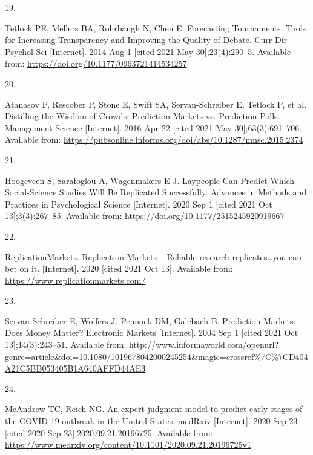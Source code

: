 \documentclass[
]{article}
\newlength{\cslhangindent}
\newlength{\csllabelwidth}
\newlength{\cslentryspacingunit} %
\newenvironment{CSLReferences}[2] %
 {%
  \setlength{\parindent}{0pt}
  \ifodd #1
  \let\oldpar\par
  \def\par{\hangindent=\cslhangindent\oldpar}
  \fi
  \setlength{\parskip}{#2\cslentryspacingunit}
 }%
 {}
\newcommand{\CSLLeftMargin}[1]{\parbox[t]{\csllabelwidth}{#1}}
\newcommand{\CSLRightInline}[1]{\parbox[t]{\linewidth - \csllabelwidth}{#1}\break}
\begin{document}
\begin{CSLReferences}{0}{0}
\leavevmode{}%
\CSLLeftMargin{19. }
\CSLRightInline{Tetlock PE, Mellers BA, Rohrbaugh N, Chen E. Forecasting {Tournaments}: {Tools} for {Increasing Transparency} and {Improving} the {Quality} of {Debate}. Curr Dir Psychol Sci {[}Internet{]}. 2014 Aug 1 {[}cited 2021 May 30{]};23(4):290--5. Available from: \url{https://doi.org/10.1177/0963721414534257}}

\leavevmode{}%
\CSLLeftMargin{20. }
\CSLRightInline{Atanasov P, Rescober P, Stone E, Swift SA, Servan-Schreiber E, Tetlock P, et al. Distilling the {Wisdom} of {Crowds}: {Prediction Markets} vs. {Prediction Polls}. Management Science {[}Internet{]}. 2016 Apr 22 {[}cited 2021 May 30{]};63(3):691--706. Available from: \url{https://pubsonline.informs.org/doi/abs/10.1287/mnsc.2015.2374}}

\leavevmode{}%
\CSLLeftMargin{21. }
\CSLRightInline{Hoogeveen S, Sarafoglou A, Wagenmakers E-J. Laypeople {Can Predict Which Social-Science Studies Will Be Replicated Successfully}. Advances in Methods and Practices in Psychological Science {[}Internet{]}. 2020 Sep 1 {[}cited 2021 Oct 13{]};3(3):267--85. Available from: \url{https://doi.org/10.1177/2515245920919667}}

\leavevmode{}%
\CSLLeftMargin{22. }
\CSLRightInline{ReplicationMarkets. Replication {Markets} -- {Reliable} research replicates\ldots you can bet on it. {[}Internet{]}. 2020 {[}cited 2021 Oct 13{]}. Available from: \url{https://www.replicationmarkets.com/}}

\leavevmode{}%
\CSLLeftMargin{23. }
\CSLRightInline{Servan-Schreiber E, Wolfers J, Pennock DM, Galebach B. Prediction {Markets}: {Does Money Matter}? Electronic Markets {[}Internet{]}. 2004 Sep 1 {[}cited 2021 Oct 13{]};14(3):243--51. Available from: \url{http://www.informaworld.com/openurl?genre=article\&doi=10.1080/1019678042000245254\&magic=crossref\%7C\%7CD404A21C5BB053405B1A640AFFD44AE3}}

\leavevmode{}%
\CSLLeftMargin{24. }
\CSLRightInline{McAndrew TC, Reich NG. An expert judgment model to predict early stages of the {COVID-19} outbreak in the {United States}. medRxiv {[}Internet{]}. 2020 Sep 23 {[}cited 2020 Sep 23{]};2020.09.21.20196725. Available from: \url{https://www.medrxiv.org/content/10.1101/2020.09.21.20196725v1}}


\end{CSLReferences}
\end{document}
